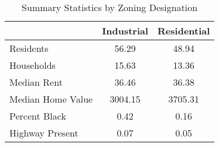 \begin{table}[h]
\centering
\caption{Summary Statistics by Zoning Designation}
\label{tab:summ_stats_zone}
\begin{tabular}{lcc}
\toprule
 & Industrial & Residential \\
\midrule
Residents & 56.29 & 48.94 \\
Households & 15.63 & 13.36 \\
Median Rent & 36.46 & 36.38 \\
Median Home Value & 3004.15 & 3705.31 \\
Percent Black & 0.42 & 0.16 \\
Highway Present & 0.07 & 0.05 \\
\bottomrule
\end{tabular}
\end{table}
